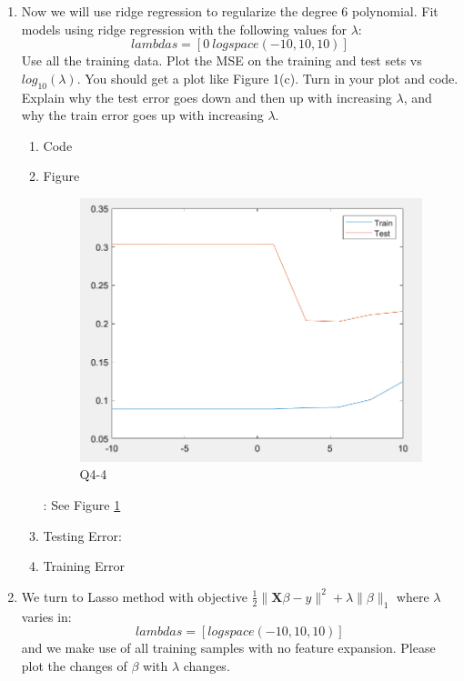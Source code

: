 \documentclass[11pt]{article}
\newcommand{\mfile}[1]  {{\small }} %
\newcommand{\mtx}[1]{\mathbf{#1}}
\def \mX {\mtx{X}}
\begin{document}
\begin{enumerate}
\item Now we will use ridge regression to regularize the degree 6 polynomial. Fit models using ridge regression with
the following values for $\lambda$:
$$lambdas=[0 \  logspace(-10,10,10)]$$
Use all the training data. Plot the MSE on the training and test sets vs $log_{10}(\lambda)$. You should get a plot like
Figure 1(c). Turn in your plot and code. Explain why the test error goes down and then up with increasing $\lambda$,
and why the train error goes up with increasing $\lambda$.
	\begin{enumerate}
		\item Code \mfile{q4.m}
		\item Figure
		\begin{figure}[h!]
			\centering
			\includegraphics[width=0.5\linewidth]{Q44.png}
			\caption{Q4-4}
			\label{fig:Q4_4}
		\end{figure}:
		See Figure \ref{fig:Q4_4}
		\item Testing Error: 
		\item Training Error
	\end{enumerate}
\item We turn to Lasso method with objective $\frac{1}{2}\|\mX \beta-y\|^2+\lambda\|\beta\|_1$ where $\lambda$ varies in: $$lambdas=[logspace(-10,10,10)]$$ and we make use of all training samples with no feature expansion. Please plot the changes of $\beta$ with $\lambda$ changes.
\end{enumerate}
\end{document}
